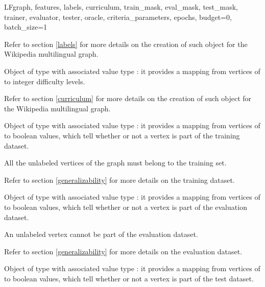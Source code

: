 \begin{independentfunctiondoc}{LF}{graph, features, labels, curriculum, train\_mask, eval\_mask, test\_mask, trainer, evaluator, tester, oracle, criteria\_parameters, epochs, budget=0, batch\_size=1}
\begin{functionparameters}
                    Refer to section \ref{labels} for more details on the creation of such object for the Wikipedia multilingual graph.
                    \item[curriculum] 
                    
                    Object of type  with associated value type : it provides a mapping from vertices of  \normalfont to integer difficulty levels.
                    
                    Refer to section \ref{curriculum} for more details on the creation of such object for the Wikipedia multilingual graph.
                    \item[train\_mask] 
                    
                    Object of type  with associated value type : it provides a mapping from vertices of  \normalfont to boolean values, which tell whether or not a vertex is part of the training dataset.
                    
                    All the unlabeled vertices of the graph must belong to the training set.
                    
                    Refer to section \ref{generalizability} for more details on the training dataset.
                    \item[eval\_mask] 
                    
                    Object of type  with associated value type : it provides a mapping from vertices of  \normalfont to boolean values, which tell whether or not a vertex is part of the evaluation dataset.
                    
                    An unlabeled vertex cannot be part of the evaluation dataset.
                    
                    Refer to section \ref{generalizability} for more details on the evaluation dataset.
                    \item[test\_mask] 
                    
                    Object of type  with associated value type : it provides a mapping from vertices of  \normalfont to boolean values, which tell whether or not a vertex is part of the test dataset.
                    

\end{functionparameters}
\end{independentfunctiondoc}
